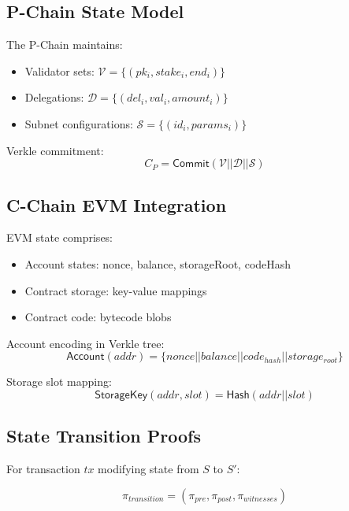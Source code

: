 \documentclass[11pt,a4paper]{article}
\theoremstyle{definition}
\begin{document}
\subsection{P-Chain State Model}

The P-Chain maintains:
\begin{itemize}
    \item Validator sets: $\mathcal{V} = \{(pk_i, stake_i, end_i)\}$
    \item Delegations: $\mathcal{D} = \{(del_i, val_i, amount_i)\}$
    \item Subnet configurations: $\mathcal{S} = \{(id_i, params_i)\}$
\end{itemize}

Verkle commitment:
\begin{equation}
    C_{P} = \mathsf{Commit}(\mathcal{V} || \mathcal{D} || \mathcal{S})
\end{equation}

\subsection{C-Chain EVM Integration}

EVM state comprises:
\begin{itemize}
    \item Account states: nonce, balance, storageRoot, codeHash
    \item Contract storage: key-value mappings
    \item Contract code: bytecode blobs
\end{itemize}

Account encoding in Verkle tree:
\begin{equation}
    \mathsf{Account}(addr) = \{nonce || balance || code_{hash} || storage_{root}\}
\end{equation}

Storage slot mapping:
\begin{equation}
    \mathsf{StorageKey}(addr, slot) = \mathsf{Hash}(addr || slot)
\end{equation}

\subsection{State Transition Proofs}

For transaction $tx$ modifying state from $S$ to $S'$:

\begin{equation}
    \pi_{transition} = (\pi_{pre}, \pi_{post}, \pi_{witnesses})
\end{equation}
\end{document}
